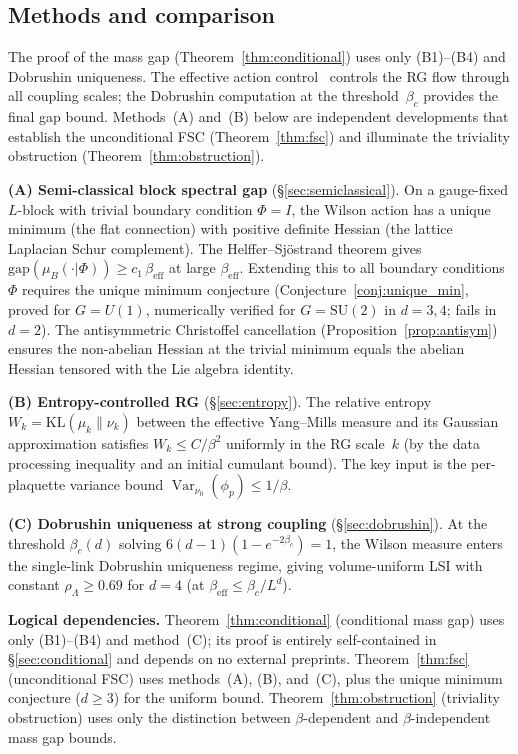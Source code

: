 \documentclass[11pt,a4paper]{article}
\theoremstyle{plain}
\theoremstyle{definition}
\theoremstyle{remark}
\newcommand{\Var}{\operatorname{Var}}
\newcommand{\SU}{\mathrm{SU}}
\newcommand{\KL}{\mathrm{KL}}
\newcommand{\gap}{\mathrm{gap}}
\begin{document}
\subsection{Methods and comparison}

\noindent The proof of the mass gap
(Theorem~\ref{thm:conditional}) uses only (B1)--(B4) \cite{FontesSU2}
and Dobrushin uniqueness.  The effective action
control~\cite{FontesSU2}
controls the RG flow through all coupling scales; the Dobrushin
computation at the threshold~$\beta_c$ provides the final
gap bound.  Methods~(A) and~(B) below are independent
developments that establish the unconditional FSC
(Theorem~\ref{thm:fsc}) and illuminate the triviality
obstruction (Theorem~\ref{thm:obstruction}).

\smallskip
\noindent\textbf{(A) Semi-classical block spectral gap}
(\S\ref{sec:semiclassical}).
On a gauge-fixed $L$-block with trivial boundary condition
$\Phi = I$, the Wilson action has a unique
minimum (the flat connection) with positive definite Hessian
(the lattice Laplacian Schur complement).
The Helffer--Sj\"ostrand theorem gives
$\gap(\mu_B(\cdot|\Phi)) \geq c_1\,\beta_{\mathrm{eff}}$
at large $\beta_{\mathrm{eff}}$.
Extending this to all boundary conditions~$\Phi$ requires the
unique minimum conjecture (Conjecture~\ref{conj:unique_min},
proved for $G = U(1)$, numerically verified for
$G = \SU(2)$ in $d = 3, 4$; fails in $d = 2$).
The antisymmetric Christoffel cancellation
(Proposition~\ref{prop:antisym})
ensures the non-abelian Hessian at the trivial minimum equals
the abelian Hessian tensored with the Lie algebra identity.

\smallskip
\noindent\textbf{(B) Entropy-controlled RG}
(\S\ref{sec:entropy}).
The relative entropy $W_k = \KL(\mu_k \| \nu_k)$ between
the effective Yang--Mills measure and its Gaussian
approximation satisfies $W_k \leq C/\beta^2$ uniformly
in the RG scale~$k$ (by the data processing inequality
and an initial cumulant bound).
The key input is the per-plaquette variance bound
$\Var_{\nu_0}(\phi_p) \leq 1/\beta$.

\smallskip
\noindent\textbf{(C) Dobrushin uniqueness at strong coupling}
(\S\ref{sec:dobrushin}).
At the threshold $\beta_c(d)$ solving
$6(d-1)(1 - e^{-2\beta_c}) = 1$, the Wilson measure enters
the single-link Dobrushin uniqueness regime, giving
volume-uniform LSI with constant $\rho_\Lambda \geq 0.69$
for $d = 4$ (at $\beta_{\mathrm{eff}} \leq \beta_c/L^d$).

\smallskip
\noindent\textbf{Logical dependencies.}
Theorem~\ref{thm:conditional} (conditional mass gap) uses
only (B1)--(B4) \cite{FontesSU2} and method~(C); its proof
is entirely self-contained in \S\ref{sec:conditional}
and depends on no external preprints.
Theorem~\ref{thm:fsc} (unconditional FSC) uses methods~(A),
(B), and~(C), plus the unique minimum conjecture ($d \geq 3$)
for the uniform bound.
Theorem~\ref{thm:obstruction} (triviality obstruction) uses
only the distinction between $\beta$-dependent and
$\beta$-independent mass gap bounds.
\end{document}
